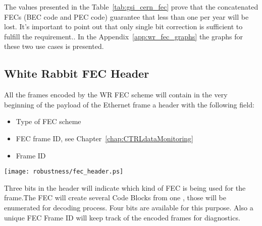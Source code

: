The values presented in the Table~\ref{tab:gsi_cern_fec} prove that the
concatenated FECs (BEC code and PEC code) guarantee that less than one
\ControlMessage per year will be lost. It's important to point out that only
single bit correction is sufficient to fulfill the requirement..
In the Appendix~\ref{app:wr_fec_graphs} the graphs for these two use
cases is presented.

\subsection{White Rabbit FEC Header}

All the frames encoded by the WR FEC scheme will contain in the very beginning
of the payload of the Ethernet frame a header with the following field:

\begin{itemize}
	\item Type of FEC scheme
	\item FEC frame ID, see Chapter~\ref{chap:CTRLdataMonitoring}
	\item Frame ID
\end{itemize}

\begin{center}
        \texttt{[image: robustness/fec\_header.ps]}
         \label{fig:fec_header}
\end{center}

Three bits in the header will indicate which kind of FEC is being used for the
frame.The FEC will create several Code Blocks from one \ControlMessage, those
will be enumerated for decoding process. Four bits are available for this
purpose. Also a unique FEC Frame ID will keep track of the encoded frames for
diagnostics.






